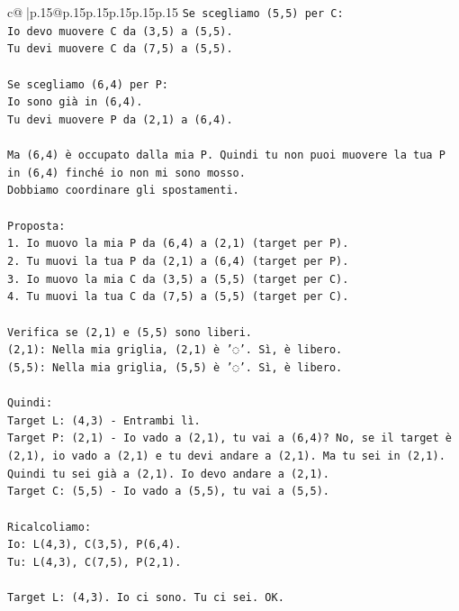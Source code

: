 \documentclass{article}
\begin{document}
{\begin{supertabular}{c@{$\;$}|p{.15\linewidth}@{}p{.15\linewidth}p{.15\linewidth}p{.15\linewidth}p{.15\linewidth}p{.15\linewidth}}
{{{\texttt{Se scegliamo (5,5) per C:} \\
\texttt{Io devo muovere C da (3,5) a (5,5).} \\
\texttt{Tu devi muovere C da (7,5) a (5,5).} \\
\\ 
\texttt{Se scegliamo (6,4) per P:} \\
\texttt{Io sono già in (6,4).} \\
\texttt{Tu devi muovere P da (2,1) a (6,4).} \\
\\ 
\texttt{Ma (6,4) è occupato dalla mia P. Quindi tu non puoi muovere la tua P in (6,4) finché io non mi sono mosso.} \\
\texttt{Dobbiamo coordinare gli spostamenti.} \\
\\ 
\texttt{Proposta:} \\
\texttt{1. Io muovo la mia P da (6,4) a (2,1) (target per P).} \\
\texttt{2. Tu muovi la tua P da (2,1) a (6,4) (target per P).} \\
\texttt{3. Io muovo la mia C da (3,5) a (5,5) (target per C).} \\
\texttt{4. Tu muovi la tua C da (7,5) a (5,5) (target per C).} \\
\\ 
\texttt{Verifica se (2,1) e (5,5) sono liberi.} \\
\texttt{(2,1): Nella mia griglia, (2,1) è '◌'. Sì, è libero.} \\
\texttt{(5,5): Nella mia griglia, (5,5) è '◌'. Sì, è libero.} \\
\\ 
\texttt{Quindi:} \\
\texttt{Target L: (4,3) {-} Entrambi lì.} \\
\texttt{Target P: (2,1) {-} Io vado a (2,1), tu vai a (6,4)? No, se il target è (2,1), io vado a (2,1) e tu devi andare a (2,1). Ma tu sei in (2,1). Quindi tu sei già a (2,1). Io devo andare a (2,1).} \\
\texttt{Target C: (5,5) {-} Io vado a (5,5), tu vai a (5,5).} \\
\\ 
\texttt{Ricalcoliamo:} \\
\texttt{Io: L(4,3), C(3,5), P(6,4).} \\
\texttt{Tu: L(4,3), C(7,5), P(2,1).} \\
\\ 
\texttt{Target L: (4,3). Io ci sono. Tu ci sei. OK.} \\
}}}
\end{supertabular}}
\end{document}
